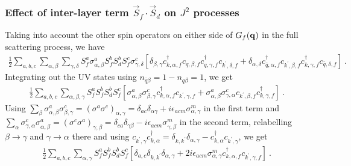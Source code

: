 \subsubsection*{Effect of inter-layer term \(\vec{S}_f\cdot\vec{S}_d\) on \(J^2\) processes}
Taking into account the other spin operators on either side of \(G_f({\bf q})\) in the full scattering process, we have
\begin{equation}\begin{aligned}
	\frac{1}{2}\sum_{a,b,c} \sum_{\alpha,\beta} \sum_{\gamma,\delta} S_f^a \sigma^a_{\alpha,\beta} S_f^b S_d^b S_f^c \sigma^c_{\gamma,\delta}\left[\delta_{\beta,\gamma}c^\dagger_{k,\alpha,f}c_{q,\beta,f} c^\dagger_{q,\gamma,f}c_{k^\prime,\delta,f} + \delta_{\alpha,\delta}c^\dagger_{\bar q,\alpha,f}c_{k^\prime,\beta,f} c^\dagger_{k,\gamma,f}c_{\bar q,\delta,f}\right]~.
\end{aligned}\end{equation}
Integrating out the UV states using \(n_{\bar q\beta} = 1 - n_{q\beta} = 1\), we get
\begin{equation}\begin{aligned}
	\frac{1}{2}\sum_{a,b,c} \sum_{\alpha,\beta,\gamma} S_f^a S_f^b S_d^b S_f^c \left[\sigma^a_{\alpha,\beta} \sigma^c_{\beta,\gamma}c^\dagger_{k,\alpha,f} c_{k^\prime,\gamma,f} + \sigma^a_{\alpha,\beta} \sigma^c_{\gamma,\alpha}c_{k^\prime,\beta,f} c^\dagger_{k,\gamma,f}\right]~.
\end{aligned}\end{equation}
Using \(\sum_\beta \sigma^a_{\alpha,\beta} \sigma^c_{\beta,\gamma} = (\sigma^a \sigma^c)_{\alpha,\gamma} = \delta_{ac}\delta_{\alpha\gamma} + i \epsilon_{acm} \sigma^m_{\alpha,\gamma}\) in the first term and \(\sum_\alpha \sigma^c_{\gamma,\alpha} \sigma^a_{\alpha,\beta} = (\sigma^c \sigma^a)_{\gamma,\beta} = \delta_{ca}\delta_{\gamma\beta} - i\epsilon_{acm}\sigma^m_{\gamma,\beta}\) in the second term, relabelling \(\beta \to \gamma\) and \(\gamma \to \alpha\) there and using \(c_{k^\prime,\gamma} c^\dagger_{k,\alpha} = \delta_{k,k^\prime}\delta_{\alpha,\gamma} - c^\dagger_{k,\alpha} c_{k^\prime,\gamma}\), we get
\begin{equation}\begin{aligned}\label{interm1}
	\frac{1}{2}\sum_{a,b,c} \sum_{\alpha,\gamma} S_f^a S_f^b S_d^b S_f^c \left[\delta_{a,c}\delta_{k,k^\prime}\delta_{\alpha,\gamma} + 2i \epsilon_{acm} \sigma^m_{\alpha,\gamma}c^\dagger_{k,\alpha,f} c_{k^\prime,\gamma,f}\right]~.
\end{aligned}\end{equation}
